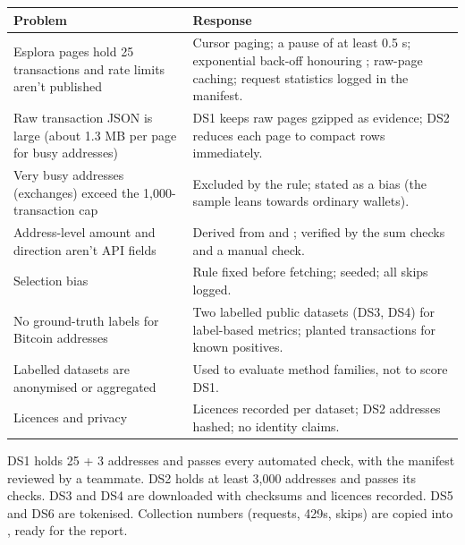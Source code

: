 \begin{center}
\small
\begin{tabularx}{\textwidth}{@{}L{4.2cm}Y@{}}
\toprule
\textbf{Problem} & \textbf{Response} \\
\midrule
Esplora pages hold 25 transactions and rate limits aren't published & Cursor paging; a pause of at least 0.5 s; exponential back-off honouring ; raw-page caching; request statistics logged in the manifest. \\
Raw transaction JSON is large (about 1.3 MB per page for busy addresses) & DS1 keeps raw pages gzipped as evidence; DS2 reduces each page to compact rows immediately. \\
Very busy addresses (exchanges) exceed the 1,000-transaction cap & Excluded by the rule; stated as a bias (the sample leans towards ordinary wallets). \\
Address-level amount and direction aren't API fields & Derived from  and ; verified by the sum checks and a manual check. \\
Selection bias & Rule fixed before fetching; seeded; all skips logged. \\
No ground-truth labels for Bitcoin addresses & Two labelled public datasets (DS3, DS4) for label-based metrics; planted transactions for known positives. \\
Labelled datasets are anonymised or aggregated & Used to evaluate method families, not to score DS1. \\
Licences and privacy & Licences recorded per dataset; DS2 addresses hashed; no identity claims. \\
\bottomrule
\end{tabularx}
\end{center}

\begin{done}
DS1 holds 25 + 3 addresses and passes every automated check, with the manifest reviewed by a
teammate. DS2 holds at least 3,000 addresses and passes its checks. DS3 and DS4 are downloaded
with checksums and licences recorded. DS5 and DS6 are tokenised. Collection numbers (requests,
429s, skips) are copied into , ready for the report.
\end{done}
